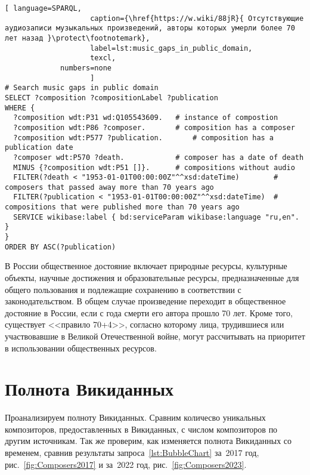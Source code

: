 \begin{lstlisting}[ language=SPARQL,
                    caption={\href{https://w.wiki/88jR}{ Отсутствующие аудиозаписи музыкальных произведений, авторы которых умерли более 70 лет назад }\protect\footnotemark},
                    label=lst:music_gaps_in_public_domain,
                    texcl,
	         numbers=none
                    ]
# Search music gaps in public domain
SELECT ?composition ?compositionLabel ?publication
WHERE {
  ?composition wdt:P31 wd:Q105543609.	# instance of compostion
  ?composition wdt:P86 ?composer.		# composition has a composer
  ?composition wdt:P577 ?publication.		# composition has a publication date
  ?composer wdt:P570 ?death.			# composer has a date of death
  MINUS {?composition wdt:P51 []}.		# compositions without audio 
  FILTER(?death < "1953-01-01T00:00:00Z"^^xsd:dateTime)        # composers that passed away more than 70 years ago
  FILTER(?publication < "1953-01-01T00:00:00Z"^^xsd:dateTime)  # compositions that were published more than 70 years ago
  SERVICE wikibase:label { bd:serviceParam wikibase:language "ru,en". }
}
ORDER BY ASC(?publication)
\end{lstlisting}%

В России общественное достояние включает природные ресурсы, культурные объекты, научные достижения и образовательные ресурсы, предназначенные для общего пользования и подлежащие сохранению в соответствии с законодательством. В общем случае произведение переходит в общественное достояние в России, если с года смерти его автора прошло 70 лет. Кроме того, существует <<правило 70+4>>, согласно которому лица, трудившиеся или участвовавшие в Великой Отечественной войне, могут рассчитывать на приоритет в использовании общественных ресурсов.

\section{Полнота Викиданных}
Проанализируем полноту Викиданных. Сравним количесво уникальных композиторов, предоставленных в Викиданных, с числом композиторов по другим источникам. Так же проверим, как изменяется полнота Викиданных со временем, сравнив результаты запроса~\ref{lst:BubbleChart} за~2017 год, рис.~\ref{fig:Composers2017} и за~2022 год, рис.~\ref{fig:Composers2023}.

